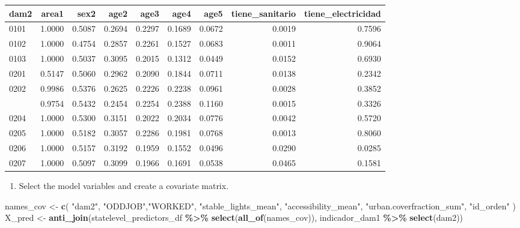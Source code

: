 \documentclass[
  12pt,
]{book}
\newenvironment{Shaded}{\begin{snugshade}}{\end{snugshade}}
\newcommand{\FunctionTok}[1]{\textcolor[rgb]{0.13,0.29,0.53}{\textbf{#1}}}
\newcommand{\NormalTok}[1]{#1}
\newcommand{\OtherTok}[1]{\textcolor[rgb]{0.56,0.35,0.01}{#1}}
\newcommand{\SpecialCharTok}[1]{\textcolor[rgb]{0.81,0.36,0.00}{\textbf{#1}}}
\newcommand{\StringTok}[1]{\textcolor[rgb]{0.31,0.60,0.02}{#1}}
\providecommand{\tightlist}{%
  \setlength{\itemsep}{0pt}\setlength{\parskip}{0pt}}
\begin{document}
\begin{table}[H]
\centering
\centering
\begin{tabular}[t]{lrrrrrrrr}
\toprule
dam2 & area1 & sex2 & age2 & age3 & age4 & age5 & tiene\_sanitario & tiene\_electricidad\\
\midrule
0101 & 1.0000 & 0.5087 & 0.2694 & 0.2297 & 0.1689 & 0.0672 & 0.0019 & 0.7596\\
0102 & 1.0000 & 0.4754 & 0.2857 & 0.2261 & 0.1527 & 0.0683 & 0.0011 & 0.9064\\
0103 & 1.0000 & 0.5037 & 0.3095 & 0.2015 & 0.1312 & 0.0449 & 0.0152 & 0.6930\\
0201 & 0.5147 & 0.5060 & 0.2962 & 0.2090 & 0.1844 & 0.0711 & 0.0138 & 0.2342\\
0202 & 0.9986 & 0.5376 & 0.2625 & 0.2226 & 0.2238 & 0.0961 & 0.0028 & 0.3852\\
\addlinespace
0203 & 0.9754 & 0.5432 & 0.2454 & 0.2254 & 0.2388 & 0.1160 & 0.0015 & 0.3326\\
0204 & 1.0000 & 0.5300 & 0.3151 & 0.2022 & 0.2034 & 0.0776 & 0.0042 & 0.5720\\
0205 & 1.0000 & 0.5182 & 0.3057 & 0.2286 & 0.1981 & 0.0768 & 0.0013 & 0.8060\\
0206 & 1.0000 & 0.5157 & 0.3192 & 0.1959 & 0.1552 & 0.0496 & 0.0290 & 0.0285\\
0207 & 1.0000 & 0.5097 & 0.3099 & 0.1966 & 0.1691 & 0.0538 & 0.0465 & 0.1581\\
\bottomrule
\end{tabular}
\end{table}

\begin{enumerate}
\def\labelenumi{\arabic{enumi}.}
\setcounter{enumi}{1}
\tightlist
\item
  Select the model variables and create a covariate matrix.
\end{enumerate}

\begin{Shaded}
\begin{Highlighting}[]
\NormalTok{names\_cov }\OtherTok{\textless{}{-}}
  \FunctionTok{c}\NormalTok{(}
   \StringTok{"dam2"}\NormalTok{,}
    \StringTok{"ODDJOB"}\NormalTok{,}\StringTok{"WORKED"}\NormalTok{,}
    \StringTok{"stable\_lights\_mean"}\NormalTok{,}
    \StringTok{"accessibility\_mean"}\NormalTok{,}
    \StringTok{"urban.coverfraction\_sum"}\NormalTok{,}
    \StringTok{"id\_orden"}
\NormalTok{  )}
\NormalTok{X\_pred }\OtherTok{\textless{}{-}}
  \FunctionTok{anti\_join}\NormalTok{(statelevel\_predictors\_df }\SpecialCharTok{\%\textgreater{}\%} \FunctionTok{select}\NormalTok{(}\FunctionTok{all\_of}\NormalTok{(names\_cov)),}
\NormalTok{            indicador\_dam1 }\SpecialCharTok{\%\textgreater{}\%} \FunctionTok{select}\NormalTok{(dam2))}
\end{Highlighting}
\end{Shaded}
\end{document}
